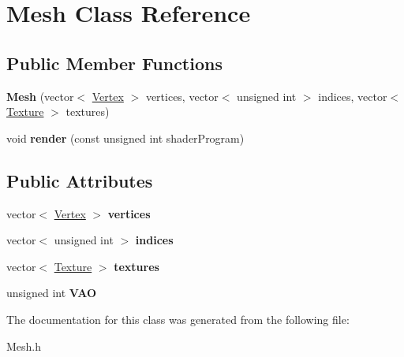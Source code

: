 \hypertarget{class_mesh}{}\section{Mesh Class Reference}
\label{class_mesh}
\subsection*{Public Member Functions}
\begin{DoxyCompactItemize}
\item 
\mbox{\label{class_mesh_a2d6c71adb66e5f270cee7a60c4e23018}} 
{\bfseries Mesh} (vector$<$ \mbox{\hyperlink{struct_vertex}{Vertex}} $>$ vertices, vector$<$ unsigned int $>$ indices, vector$<$ \mbox{\hyperlink{struct_texture}{Texture}} $>$ textures)
\item 
\mbox{\label{class_mesh_a9a6ec018bec776cb7b31fb8433c8a7e7}} 
void {\bfseries render} (const unsigned int shader\+Program)
\end{DoxyCompactItemize}
\subsection*{Public Attributes}
\begin{DoxyCompactItemize}
\item 
\mbox{\label{class_mesh_abe5c05c224e47ba1e8b6393759798a9b}} 
vector$<$ \mbox{\hyperlink{struct_vertex}{Vertex}} $>$ {\bfseries vertices}
\item 
\mbox{\label{class_mesh_a464d9a1d7e7a4f67321dffc1e8b44b7d}} 
vector$<$ unsigned int $>$ {\bfseries indices}
\item 
\mbox{\label{class_mesh_a09bf4e8307bf7717c56501ca6293c6c0}} 
vector$<$ \mbox{\hyperlink{struct_texture}{Texture}} $>$ {\bfseries textures}
\item 
\mbox{\label{class_mesh_a79afa055e485fb65b1a7aa5b8eda2940}} 
unsigned int {\bfseries V\+AO}
\end{DoxyCompactItemize}


The documentation for this class was generated from the following file\+:\begin{DoxyCompactItemize}
\item 
Mesh.\+h\end{DoxyCompactItemize}
